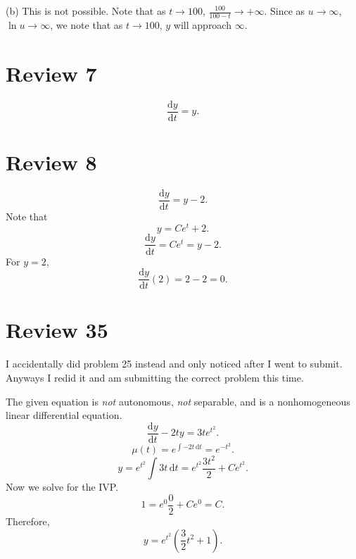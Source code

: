 \documentclass[11pt, letterpaper]{report}
\begin{document}
(b) This is not possible. Note that as $t\to 100$, $\frac{100}{100-t}\to +\infty$. Since as $u\to \infty$, $\ln u\to \infty$, we note that as $t\to 100$, $y$ will approach $\infty$.
\section*{Review 7}
\[
	\frac{\mathrm{d}y}{\mathrm{d}t} =y
.\]

\section*{Review 8}
\[
	\frac{\mathrm{d}y}{\mathrm{d}t} =y-2
.\]
Note that
\[
	y=Ce^t+2
.\]
\[
	\frac{\mathrm{d}y}{\mathrm{d}t} =Ce^t=y-2
.\]
For $y=2$,
\[
	\frac{\mathrm{d}y}{\mathrm{d}t} (2)=2-2=0
.\]
\section*{Review 35}
I accidentally did problem 25 instead and only noticed after I went to submit. Anyways I redid it and am submitting the correct problem this time.

The given equation is \emph{not} autonomous, \emph{not} separable, and is a nonhomogeneous linear differential equation.
\[
	\frac{\mathrm{d}y}{\mathrm{d}t} -2ty=3te ^{t^2}
.\]
\[
	\mu (t)=e^{\int -2t \,\mathrm{d} t}=e^{-t^2}
.\]
\[
	y=e^{t^2}\int 3t \,\mathrm{d} t=e^{t^2}\frac{3t^2}{2}+Ce^{t^2}
.\]
Now we solve for the IVP.
\[
	1=e^{0} \frac{0}{2}+Ce^{0}=C
.\]
Therefore,
\[
	y=e^{t^2}\left( \frac{3}{2}t^2+1 \right) 
.\]
\end{document}
